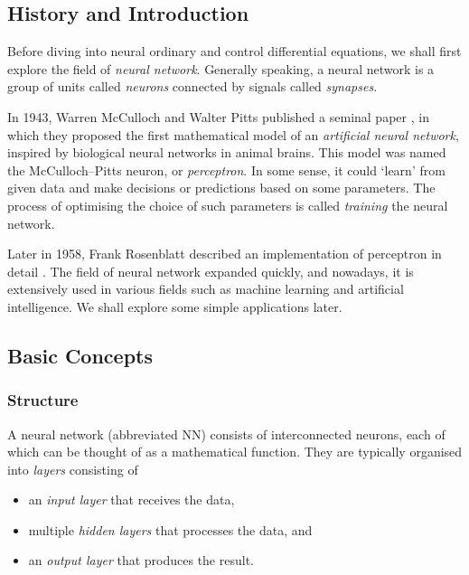 \documentclass[a4paper,11pt, titlepage]{article}
\theoremstyle{definition}
\theoremstyle{plain}
\theoremstyle{remark}
\begin{document}
\subsection{History and Introduction}

Before diving into neural ordinary and control differential equations, we shall first explore the field of \textit{neural network}. Generally speaking, a neural network is a group of units called \textit{neurons} connected by signals called \textit{synapses}.

In 1943, Warren McCulloch and Walter Pitts published a seminal paper \cite{McCulloch1943}, in which they proposed the first mathematical model of an \textit{artificial neural network}, inspired by biological neural networks in animal brains. This model was named the McCulloch–Pitts neuron, or \textit{perceptron}. In some sense, it could ‘learn’ from given data and make decisions or predictions based on some parameters. The process of optimising the choice of such parameters is called \textit{training} the neural network.

Later in 1958, Frank Rosenblatt described an implementation of perceptron in detail \cite{Rosenblatt1958}. The field of neural network expanded quickly, and nowadays, it is extensively used in various fields such as machine learning and artificial intelligence. We shall explore some simple applications later.

\subsection{Basic Concepts}

\subsubsection{Structure}

A neural network (abbreviated NN) consists of interconnected neurons, each of which can be thought of as a mathematical function. They are typically organised into \textit{layers} consisting of

\begin{itemize}
    \item an \textit{input layer} that receives the data,
    \item multiple \textit{hidden layers} that processes the data, and
    \item an \textit{output layer} that produces the result.
\end{itemize}
\end{document}
